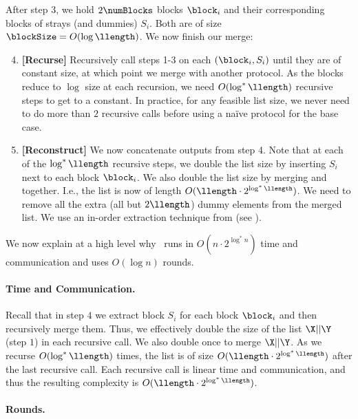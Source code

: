 \noindent After step 3, we hold $2\numBlocks$ blocks $\block_i$ and their corresponding blocks of strays (and dummies) $S_i$. Both are of size $\blockSize=O(\log\llength)$. We now finish our merge:

\begin{enumerate}
\setcounter{enumi}{3}
    \item \label{highlevelapproach4} \textbf{[Recurse]} Recursively call steps 1-3 on each $(\block_i, S_i)$ until they are of constant size, at which point we merge with another protocol. As the blocks reduce to $\log$ size at each recursion, we need $O(\log^*\llength)$ recursive steps to get to a constant. In practice, for any feasible list size, we never need to do more than $2$ recursive calls before using a na\"ive protocol for the base case.  
    \item \label{highlevelapproach5}
    \textbf{[Reconstruct]} We now concatenate outputs from step 4. Note that at each of the $\log^*\llength$ recursive steps, we double the list size by inserting $S_i$ next to each block $\block_i$. We also double the list size by merging \X and \Y together. I.e., the list is now of length $O(\llength\cdot 2^{\log^*\llength})$. We need to remove all the extra (all but $2\llength$) dummy elements from the merged list. We use an in-order extraction technique from \cite{EPRINT:PRRS23} (see ). 
\end{enumerate}

\noindent We now explain at a high level why \ourprotocol\ runs in $O(n\cdot 2^{\log^*n})$ time and communication and uses $O(\log n)$ rounds.

\paragraph{Time and Communication.}

Recall that in step $4$ we extract block $S_i$ for each block $\block_i$ and then recursively merge them. Thus, we effectively double the size of the list $\X||\Y$ (step $1$) in each recursive call. We also double once to merge $\X||\Y$. As we recurse $O(\log^*\llength)$ times, the list is of size $O(\llength\cdot 2^{\log^*\llength})$ after the last recursive call. Each recursive call is linear time and communication, and thus the resulting complexity is $O(\llength\cdot 2^{\log^*\llength})$.

\paragraph{Rounds.}

